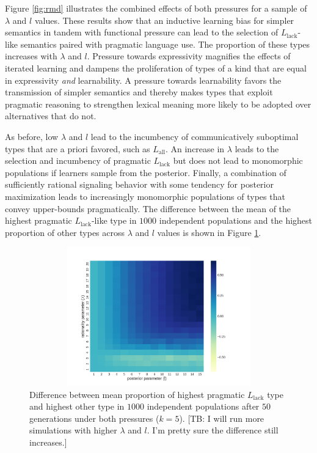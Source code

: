 \documentclass[a4paper]{article}
\newcommand{\tb}[1]{\textcolor[rgb]{.8,.33,.0}{[TB: #1]}}%
\newcommand{\mylang}[1]{\ensuremath{L_{\text{#1}}}\xspace} %
\newcommand{\Lall}{\mylang{all}}
\newcommand{\Llack}{\mylang{lack}}
\begin{document}
Figure \ref{fig:rmd} illustrates the combined effects of both pressures for a sample of $\lambda$ and $l$ values. These results show that an inductive learning bias for simpler semantics in tandem with functional pressure can lead to the selection of $\Llack$-like semantics paired with pragmatic language use. The proportion of these types increases with $\lambda$ and $l$. Pressure towards expressivity magnifies the effects of iterated learning and dampens the proliferation of types of a kind that are equal in expressivity {\em and} learnability. A pressure towards learnability favors the transmission of simpler semantics and thereby makes types that exploit pragmatic reasoning to strengthen lexical meaning more likely to be adopted over alternatives that do not. %

As before, low $\lambda$ and $l$ lead to the incumbency of communicatively suboptimal types that are a priori favored, such as $\Lall$. An increase in $\lambda$ leads to the selection and incumbency of pragmatic $\Llack$ but does not lead to monomorphic populations if learners sample from the posterior. Finally, a combination of sufficiently rational signaling behavior with some tendency for posterior maximization leads to increasingly monomorphic populations of types that convey upper-bounds pragmatically. The difference between the mean of the highest pragmatic $\Llack$-like type in $1000$ independent populations and the highest proportion of other types across $\lambda$ and $l$ values is shown in Figure \ref{fig:diff}.

\begin{figure}
\centering
\includegraphics[width=1\textwidth,height=6cm,keepaspectratio]{./plots/fig4-incumbents-difference}
\caption{Difference between mean proportion of highest pragmatic $\Llack$ type and highest other type in $1000$ independent populations after $50$ generations under both pressures ($k = 5$). \tb{I will run more simulations with higher $\lambda$ and $l$. I'm pretty sure the difference still increases.}}
\label{fig:diff}
\end{figure}
\end{document}
